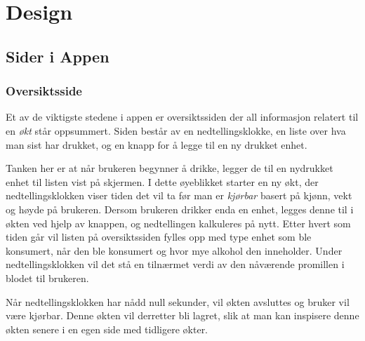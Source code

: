 \section{Design}
\subsection{Sider i Appen}
\subsubsection{Oversiktsside}
Et av de viktigste stedene i appen er oversiktssiden der all informasjon relatert til en \textit{økt} står oppsummert. Siden består av en nedtellingsklokke, en liste over hva man sist har drukket, og en knapp for å legge til en ny drukket enhet. 

Tanken her er at når brukeren begynner å drikke, legger de til en nydrukket enhet til listen vist på skjermen. I dette øyeblikket starter en ny økt, der nedtellingsklokken viser tiden det vil ta før man er \textit{kjørbar} basert på kjønn, vekt og høyde på brukeren. Dersom brukeren drikker enda en enhet, legges denne til i økten ved hjelp av knappen, og nedtellingen kalkuleres på nytt. Etter hvert som tiden går vil listen på oversiktssiden fylles opp med type enhet som ble konsumert, når den ble konsumert og hvor mye alkohol den inneholder. Under nedtellingsklokken vil det stå en tilnærmet verdi av den nåværende promillen i blodet til brukeren. 

Når nedtellingsklokken har nådd null sekunder, vil økten avsluttes og bruker vil være kjørbar. Denne økten vil derretter bli lagret, slik at man kan inspisere denne økten senere i en egen side med tidligere økter. 

